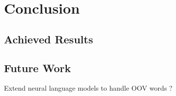 \chapter{Conclusion}

\section{Achieved Results}
\label{sec:achieved}

\section{Future Work}
\label{sec:futureWork}

Extend neural language models to handle OOV words ?

